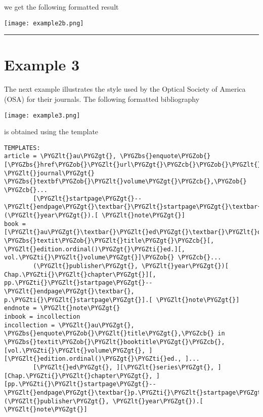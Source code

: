 \documentclass[letterpaper,10pt,english]{sphinxmanual}
\def\PYGZbs{\char`\\}
\def\PYGZob{\char`\{}
\def\PYGZcb{\char`\}}
\def\PYGZlt{\char`\<}
\def\PYGZgt{\char`\>}
\def\PYGZti{\char`\~}
\begin{document}
we get the following formatted result

\texttt{[image: example2b.png]}


\bigskip\hrule{}\bigskip



\section{Example 3}
\label{examples:example-3}
The next example illustrates the style used by the Optical Society of America (OSA) for their journals. The following formatted bibliography

\texttt{[image: example3.png]}

is obtained using the template

\begin{Verbatim}[commandchars=\\\{\}]
TEMPLATES:
article = \PYGZlt{}au\PYGZgt{}, \PYGZbs{}enquote\PYGZob{}[\PYGZbs{}href\PYGZob{}\PYGZlt{}url\PYGZgt{}\PYGZcb{}\PYGZob{}\PYGZlt{}title\PYGZgt{}\PYGZcb{}\textbar{}\PYGZbs{}href\PYGZob{}\PYGZlt{}doi\PYGZgt{}\PYGZcb{}\PYGZob{}\PYGZlt{}title\PYGZgt{}\PYGZcb{}\textbar{}\PYGZlt{}title\PYGZgt{}],\PYGZcb{} \PYGZlt{}journal\PYGZgt{} \PYGZbs{}textbf\PYGZob{}\PYGZlt{}volume\PYGZgt{}\PYGZcb{},\PYGZob{} \PYGZcb{}...
        [\PYGZlt{}startpage\PYGZgt{}--\PYGZlt{}endpage\PYGZgt{}\textbar{}\PYGZlt{}startpage\PYGZgt{}\textbar{}\PYGZlt{}eid\PYGZgt{}\textbar{}] (\PYGZlt{}year\PYGZgt{}).[ \PYGZlt{}note\PYGZgt{}]
book = [\PYGZlt{}au\PYGZgt{}\textbar{}\PYGZlt{}ed\PYGZgt{}\textbar{}\PYGZlt{}organization\PYGZgt{}\textbar{}\PYGZlt{}institution\PYGZgt{}\textbar{}], \PYGZbs{}textit\PYGZob{}\PYGZlt{}title\PYGZgt{}\PYGZcb{}[, \PYGZlt{}edition.ordinal()\PYGZgt{}\PYGZti{}ed.][, vol.\PYGZti{}\PYGZlt{}volume\PYGZgt{}]\PYGZob{} \PYGZcb{}...
        (\PYGZlt{}publisher\PYGZgt{}, \PYGZlt{}year\PYGZgt{})[ Chap.\PYGZti{}\PYGZlt{}chapter\PYGZgt{}][, pp.\PYGZti{}\PYGZlt{}startpage\PYGZgt{}--\PYGZlt{}endpage\PYGZgt{}\textbar{}, p.\PYGZti{}\PYGZlt{}startpage\PYGZgt{}].[ \PYGZlt{}note\PYGZgt{}]
endnote = \PYGZlt{}note\PYGZgt{}
inbook = incollection
incollection = \PYGZlt{}au\PYGZgt{}, \PYGZbs{}enquote\PYGZob{}\PYGZlt{}title\PYGZgt{},\PYGZcb{} in \PYGZbs{}textit\PYGZob{}\PYGZlt{}booktitle\PYGZgt{}\PYGZcb{}, [vol.\PYGZti{}\PYGZlt{}volume\PYGZgt{}, ][\PYGZlt{}edition.ordinal()\PYGZgt{}\PYGZti{}ed., ]...
        [\PYGZlt{}ed\PYGZgt{}, ][\PYGZlt{}series\PYGZgt{}, ][Chap.\PYGZti{}\PYGZlt{}chapter\PYGZgt{}, ][pp.\PYGZti{}\PYGZlt{}startpage\PYGZgt{}--\PYGZlt{}endpage\PYGZgt{}\textbar{}p.\PYGZti{}\PYGZlt{}startpage\PYGZgt{}\textbar{}\PYGZlt{}eid\PYGZgt{}\textbar{}] (\PYGZlt{}publisher\PYGZgt{}, \PYGZlt{}year\PYGZgt{}).[ \PYGZlt{}note\PYGZgt{}]

\end{Verbatim}
\end{document}
